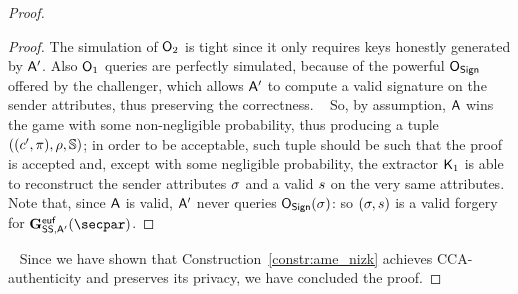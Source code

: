 \begin{proof}
\begin{lemma}
\begin{proof}
            The simulation of $\mathsf{O}_2$ is tight since it only requires keys honestly generated by $\mathsf{A}'$.
            Also $\mathsf{O}_1$ queries are perfectly simulated, because of the powerful $\mathsf{O}_{\mathsf{Sign}}$ offered by the challenger, which allows $\mathsf{A}'$ to compute a valid signature on the sender attributes, thus preserving the correctness.
            ~\newline\newline
            So, by assumption, $\mathsf{A}$ wins the game with some non-negligible probability, thus producing a tuple $((c', \pi), \rho, \mathbb{S})$; in order to be acceptable, such tuple should be such that the proof is accepted and, except with some negligible probability, the extractor $\mathsf{K}_1$ is able to reconstruct the sender attributes $\sigma$ and a valid $s$ on the very same attributes.
            Note that, since $\mathsf{A}$ is valid, $\mathsf{A}'$ never queries $\mathsf{O}_{\mathsf{Sign}}(\sigma)$: so $(\sigma, s)$ is a valid forgery for $\Sigeufgame_{\sig, \adversary'}(\secpar)$.
        \end{proof}
    \end{lemma}
    ~\newline
    Since we have shown that Construction~\ref{constr:ame_nizk} achieves CCA-authenticity and preserves its privacy, we have concluded the proof.
\end{proof}
